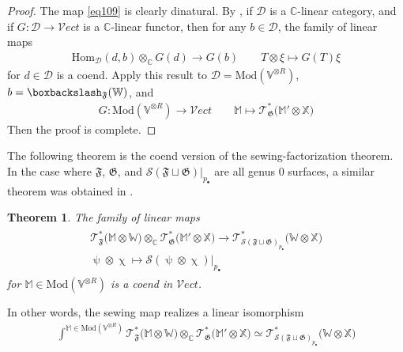 \documentclass[11pt,b5paper,notitlepage]{article}
\theoremstyle{definition}
\theoremstyle{plain}
\newtheorem{thm}[df]{Theorem}
\newcommand{\fk}{\mathfrak}
\newcommand{\Hom}{\mathrm{Hom}}
\newcommand{\Vect}{\mathcal Vect}
\newcommand{\scr}{\mathscr}
\newcommand{\blt}{\bullet}
\newcommand{\Vbb}{\mathbb V}
\newcommand{\Xbb}{\mathbb X}
\newcommand{\Wbb}{\mathbb W}
\newcommand{\Mbb}{\mathbb M}
\newcommand{\Cbb}{\mathbb C}
\newcommand{\<}{\left\langle}
\renewcommand{\>}{\right\rangle}
\newcommand{\ST}{\mathscr{T}}
\newcommand{\MS}{\mathcal{S}}
\newcommand{\bbs}{\boxbackslash}
\newcommand{\Mod}{\mathrm{Mod}}
\newcommand{\ff}{\mathfrak{F}}
\newcommand{\fg}{\mathfrak{G}}
\numberwithin{equation}{section}
\begin{document}
\begin{proof}
The map \eqref{eq109} is clearly dinatural. By \cite[Prop. 4]{FS-coends-CFT}, if $\scr D$ is a $\Cbb$-linear category, and if $G:\scr D\rightarrow\Vect$ is a $\Cbb$-linear functor, then for any $b\in\scr D$, the family of linear maps
\begin{gather*}
\Hom_{\scr D}(d,b)\otimes_\Cbb G(d)\rightarrow G(b)\qquad T\otimes \xi\mapsto G(T)\xi
\end{gather*}
for $d\in\scr D$ is a coend. Apply this result to $\scr D=\Mod(\Vbb^{\otimes R})$, $b=\bbs_\ff(\Wbb)$, and
\begin{align*}
G:\Mod(\Vbb^{\otimes R})\rightarrow\Vect\qquad \Mbb\mapsto \ST^*_\fg\big(\Mbb'\otimes\Xbb\big)
\end{align*}
Then the proof is complete.
\end{proof}


The following theorem is the coend version of the sewing-factorization theorem. In the case where $\ff$, $\fg$, and $\MS(\ff\sqcup\fg)|_{p_\blt}$ are all genus $0$ surfaces, a similar theorem was obtained in \cite{Moriwaki22-CB}.

\begin{thm}\label{lb54}
The family of linear maps
\begin{gather}\label{eq111}
\begin{gathered}
\ST^*_\ff\big(\Mbb\otimes\Wbb\big)\otimes_\Cbb\ST^*_\fg\big(\Mbb'\otimes\Xbb\big)\longrightarrow \ST_{\MS(\fk F\sqcup\fk G)_{p_\blt}}^*\big(\Wbb\otimes \Xbb\big)\\
\uppsi\otimes\upchi\mapsto  \MS(\uppsi\otimes \upchi)\big|_{p_\blt}
\end{gathered}
\end{gather}
for $\Mbb\in\Mod(\Vbb^{\otimes R})$ is a coend in $\Vect$.
\end{thm}


In other words, the sewing map realizes a linear isomorphism
\begin{align}
\int^{\Mbb\in\Mod(\Vbb^{\otimes R})}\ST^*_\ff\big(\Mbb\otimes\Wbb\big)\otimes_\Cbb\ST^*_\fg\big(\Mbb'\otimes\Xbb\big)\simeq\ST_{\MS(\fk F\sqcup\fk G)_{p_\blt}}^*\big(\Wbb\otimes \Xbb\big)
\end{align}
\end{document}
